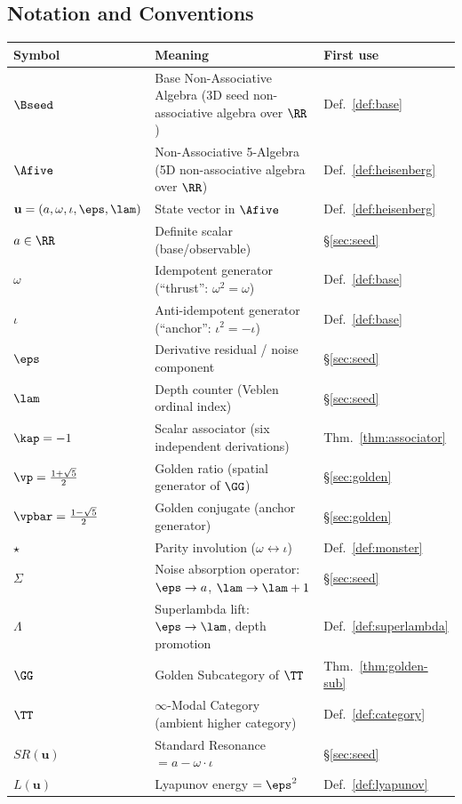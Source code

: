 \newpage

\subsection*{Notation and Conventions}

\begin{tabular}{@{}lll@{}}
\toprule
\textbf{Symbol} & \textbf{Meaning} & \textbf{First use} \\
\midrule
$\Bseed$ & Base Non-Associative Algebra (3D seed non-associative algebra over $\RR$) & Def.~\ref{def:base} \\
$\Afive$ & Non-Associative 5-Algebra (5D non-associative algebra over $\RR$) & Def.~\ref{def:heisenberg} \\
$\mathbf{u} = (a, \omega, \iota, \eps, \lam)$ & State vector in $\Afive$ & Def.~\ref{def:heisenberg} \\
$a \in \RR$ & Definite scalar (base/observable) & \S\ref{sec:seed} \\
$\omega$ & Idempotent generator (``thrust'': $\omega^2 = \omega$) & Def.~\ref{def:base} \\
$\iota$ & Anti-idempotent generator (``anchor'': $\iota^2 = -\iota$) & Def.~\ref{def:base} \\
$\eps$ & Derivative residual / noise component & \S\ref{sec:seed} \\
$\lam$ & Depth counter (Veblen ordinal index) & \S\ref{sec:seed} \\
$\kap = -1$ & Scalar associator (six independent derivations) & Thm.~\ref{thm:associator} \\
$\vp = \tfrac{1+\sqrt{5}}{2}$ & Golden ratio (spatial generator of $\GG$) & \S\ref{sec:golden} \\
$\vpbar = \tfrac{1-\sqrt{5}}{2}$ & Golden conjugate (anchor generator) & \S\ref{sec:golden} \\
$\star$ & Parity involution ($\omega \leftrightarrow \iota$) & Def.~\ref{def:monster} \\
$\Sigma$ & Noise absorption operator: $\eps \to a$, $\lam \to \lam+1$ & \S\ref{sec:seed} \\
$\Lambda$ & Superlambda lift: $\eps \to \lam$, depth promotion & Def.~\ref{def:superlambda} \\
$\GG$ & Golden Subcategory of $\TT$ & Thm.~\ref{thm:golden-sub} \\
$\TT$ & $\infty$-Modal Category (ambient higher category) & Def.~\ref{def:category} \\
$SR(\mathbf{u})$ & Standard Resonance $= a - \omega \cdot \iota$ & \S\ref{sec:seed} \\
$L(\mathbf{u})$ & Lyapunov energy $= \eps^2$ & Def.~\ref{def:lyapunov} \\
\bottomrule
\end{tabular}

